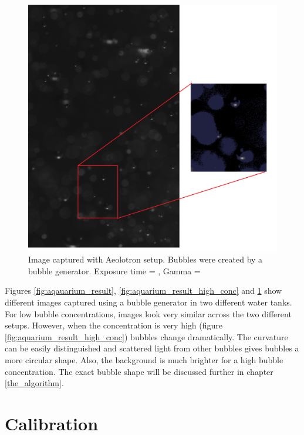 			\begin{figure}
				\centering
				\includegraphics[scale=0.3]{images/aeolotron_result.png}
				\caption{Image captured with Aeolotron setup. Bubbles were created by a bubble generator.  Exposure time = , Gamma = }
								
				\label{fig:aeolotron_result}
			\end{figure}

			Figures \ref{fig:aqauarium_result}, \ref{fig:aquarium_result_high_conc} and \ref{fig:aeolotron_result} show different images captured using a bubble generator in two different water tanks. For low bubble concentrations, images look very similar across the two different setups. However, when the concentration is very high (figure \ref{fig:aquarium_result_high_conc}) bubbles change dramatically. The curvature can be easily distinguished and scattered light from other bubbles gives bubbles a more circular shape. Also, the background is much brighter for a high bubble concentration. The exact bubble shape will be discussed further in chapter \ref{the_algorithm}.	
	
	
	\section{Calibration}\label{calibration_setup}
